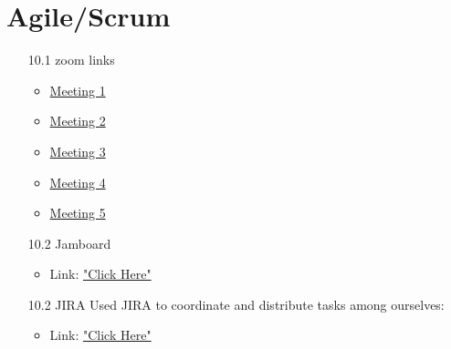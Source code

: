 \documentclass[11pt,journal,compsoc]{IEEEtran}
\begin{document}
\section{Agile/Scrum}
\begin{itemize}
    \item[10.1] zoom links
    \begin{itemize}
        \item \href{https://sjsu.zoom.us/j/89341269589?pwd=eGF5c1FSdzZNMjN2d1o3NmM4VWZsZz09}{Meeting 1}
        \item \href{https://sjsu.zoom.us/j/81816549366?pwd=alFvdDJDb1M4QUlONGRadG43ZHIzdz09}{Meeting 2}
        \item \href{https://sjsu.zoom.us/j/82071883934?pwd=dzc5Q0lPUFAvWWlvTitRL1NXNEljQT09}{Meeting 3}
        \item \href{https://sjsu.zoom.us/j/89073358102?pwd=N1Q1V3NjV2JaWVBwYnEvSXVWbVVtdz09}{Meeting 4}
        \item \href{https://sjsu.zoom.us/j/87444250053?pwd=eEV5UUs0UGRYell2VkVIeE5aL0FPUT09}{Meeting 5}
    \end{itemize}
    \item[10.2] Jamboard
    \begin{itemize}
        \item Link: \href{https://jamboard.google.com/d/1tzFwo7YGP86Y_Ly8sz05kr6Hp795oHY9Qj919PjHjvs/viewer}{"Click Here"}
    \end{itemize}
    \item[10.2] JIRA
    \newline Used JIRA to coordinate and distribute tasks among ourselves:
    \begin{itemize}
        \item Link: \href{https://dbms-project-group6.atlassian.net/jira/software/projects/HDPG/boards/1/roadmap}{"Click Here"}
    \end{itemize}
\end{itemize}
\end{document}
